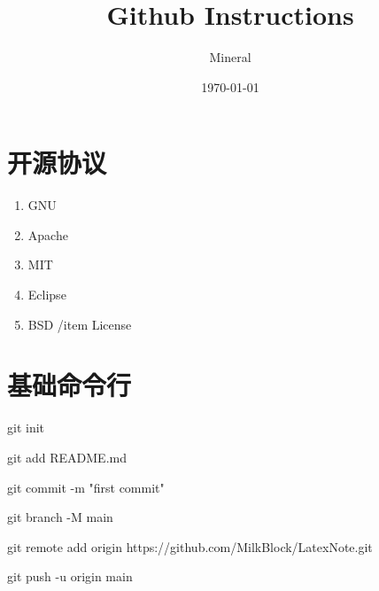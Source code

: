 \documentclass[utf8]{ctexart}
\author{Mineral}
\title{Github Instructions}
\date {\today}
\begin{document}
		\maketitle
	\section{开源协议}
    \begin{enumerate}
    		\item GNU
			\item Apache
			\item MIT
			\item Eclipse
			\item BSD
			/item License
    \end{enumerate}		
	\section{基础命令行}
	\par git init
	\par git add README.md
	\par git commit -m "first commit"
	\par git branch -M main
	\par git remote add origin https://github.com/MilkBlock/LatexNote.git
	\par git push -u origin main
	
\end{document}
